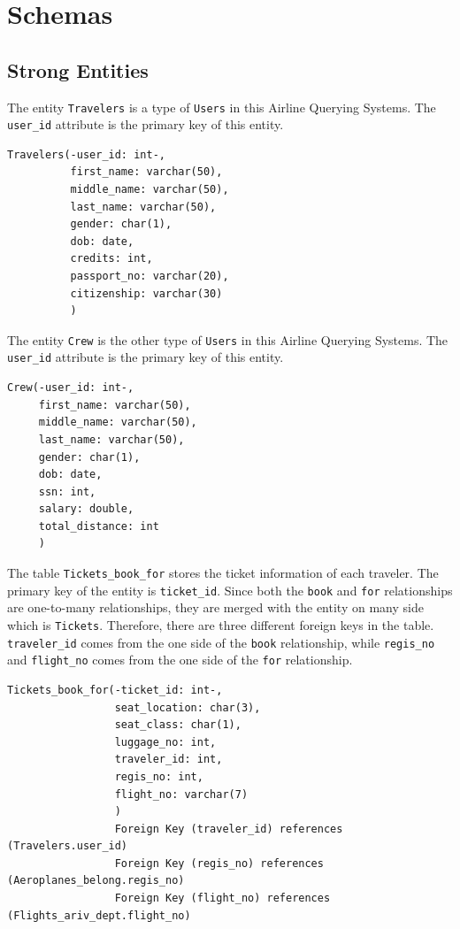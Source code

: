 \documentclass{article}
\begin{document}
	\section{Schemas}
	
	\subsection{Strong Entities}
	
	\noindent The entity \texttt{Travelers} is a type of \texttt{Users} in this Airline Querying Systems. The \texttt{user\_id} attribute is the primary key of this entity.
	\begin{lstlisting}[keepspaces=true]
Travelers(-user_id: int-,
          first_name: varchar(50),
          middle_name: varchar(50),
          last_name: varchar(50),
          gender: char(1),
          dob: date,
          credits: int,
          passport_no: varchar(20), 
          citizenship: varchar(30)
          )
	\end{lstlisting}
    
	\noindent The entity \texttt{Crew} is the other type of \texttt{Users} in this Airline Querying Systems. The \texttt{user\_id} attribute is the primary key of this entity.
	\begin{lstlisting}[keepspaces=true]
Crew(-user_id: int-,
     first_name: varchar(50),
     middle_name: varchar(50),
     last_name: varchar(50),
     gender: char(1),
     dob: date,
     ssn: int, 
     salary: double, 
     total_distance: int
     )
	\end{lstlisting}    

	\noindent The table \texttt{Tickets\_book\_for} stores the ticket information of each traveler. The primary key of the entity is  \texttt{ticket\_id}. Since both the \texttt{book} and \texttt{for} relationships are one-to-many relationships, they are merged with the entity on many side which is \texttt{Tickets}. Therefore, there are three different foreign keys in the table. \texttt{traveler\_id} comes from the one side of the \texttt{book} relationship, while \texttt{regis\_no} and \texttt{flight\_no} comes from the one side of the \texttt{for} relationship.

	\begin{lstlisting}[keepspaces=true]
Tickets_book_for(-ticket_id: int-, 
                 seat_location: char(3),
                 seat_class: char(1),
                 luggage_no: int, 
                 traveler_id: int, 
                 regis_no: int,
                 flight_no: varchar(7)
                 )
                 Foreign Key (traveler_id) references (Travelers.user_id)
                 Foreign Key (regis_no) references (Aeroplanes_belong.regis_no)
                 Foreign Key (flight_no) references (Flights_ariv_dept.flight_no)
	\end{lstlisting} 
\end{document}
